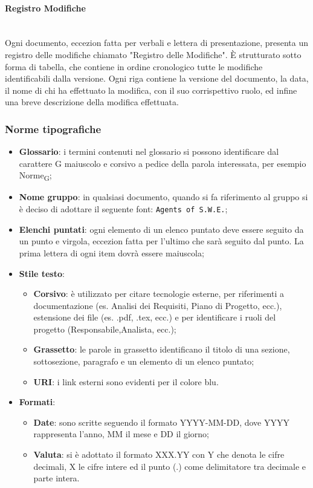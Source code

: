 \paragraph{Registro Modifiche} \-\\
Ogni documento, eccezion fatta per verbali e lettera di presentazione, presenta un registro delle modifiche chiamato "Registro delle Modifiche". È strutturato sotto forma di tabella, che contiene in ordine cronologico tutte le modifiche identificabili dalla versione.  Ogni riga contiene la versione del documento, la data, il nome di chi ha effettuato la modifica, con il suo corrispettivo ruolo, ed infine una breve descrizione della modifica effettuata.


\subsubsection{Norme tipografiche}
\begin{itemize}
	\item \textbf{Glossario}: i termini contenuti nel glossario si possono identificare dal carattere G maiuscolo e corsivo a pedice della parola interessata, per esempio Norme\textsubscript{G};	 		
	\item \textbf{Nome gruppo}: in qualsiasi documento, quando si fa riferimento al gruppo si è deciso di adottare il seguente font: \texttt{Agents of S.W.E.};
	\item \textbf{Elenchi puntati}: ogni elemento di un elenco puntato deve essere seguito da un punto e virgola, eccezion fatta per l'ultimo che sarà seguito dal punto. La prima lettera di ogni item dovrà essere maiuscola;
	\item \textbf{Stile testo}:
	\begin{itemize}
		\item \textbf{Corsivo}: è utilizzato per citare tecnologie esterne, per riferimenti a documentazione (es. Analisi dei Requisiti, Piano di Progetto, ecc.), estensione dei file (es. .pdf, .tex, ecc.) e per identificare i ruoli del progetto (Responsabile,Analista, ecc.);	
		\item \textbf{Grassetto}: le parole in grassetto identificano il titolo di una sezione, sottosezione, paragrafo e un elemento di un elenco puntato;
		\item \textbf{URI}:	i link esterni sono evidenti per il colore blu.
	\end{itemize}
	\item \textbf{Formati}:
	\begin{itemize}
		\item \textbf{Date}: sono scritte seguendo il formato YYYY-MM-DD, dove YYYY rappresenta l'anno, MM il mese e DD il giorno;
		\item \textbf{Valuta}: si è adottato il formato XXX.YY con Y che denota le cifre decimali, X le cifre intere ed il punto (.) come delimitatore tra decimale e parte intera.
	\end{itemize}
\end{itemize}



